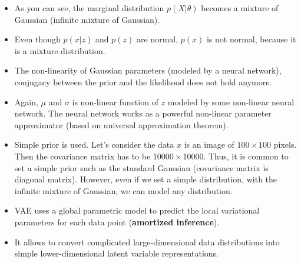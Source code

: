 \begin{itemize}
	\item As you can see, the marginal distribution $p(X|\theta)$ becomes a mixture of Gaussian (infinite mixture of Gaussian). 
	\item Even though $p(x|z)$ and $p(z)$ are normal, $p(x)$ is not normal, because it is a mixture distribution.
	\item The non-linearity of Gaussian parameters (modeled by a neural network), conjugacy between the prior and the likelihood does not hold anymore.
	\item Again, $\mu$ and $\sigma$ is non-linear function of $z$ modeled by some non-linear neural network. The neural network works as a powerful non-linear parameter approximator (based on universal approximation theorem). 
	\item Simple prior is used. Let's consider the data $x$ is an image of $100\times 100$ pixels. Then the covariance matrix has to be $10000\times 10000$. Thus, it is common to set a simple prior such as the standard Gaussian (covariance matrix is diagonal matrix). However, even if we set a simple distribution, with the infinite mixture of Gaussian, we can model any distribution.
	\item VAE uses a global parametric model to predict the local
		variational parameters for each data point (\textbf{amortized inference}). 
	\item It allows to convert complicated large-dimensional data distributions into simple lower-dimensional latent variable representations.  
\end{itemize}


